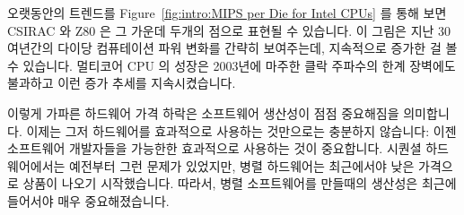 오랫동안의 트렌드를 Figure~\ref{fig:intro:MIPS per Die for Intel CPUs} 를 통해
보면 CSIRAC 와 Z80 은 그 가운데 두개의 점으로 표현될 수 있습니다.
이 그림은 지난 30여년간의 다이당 컴퓨테이션 파워 변화를 간략히 보여주는데,
지속적으로 증가한 걸 볼 수 있습니다.
멀티코어 CPU 의 성장은 2003년에 마주한 클락 주파수의 한계 장벽에도 불과하고
이런 증가 추세를 지속시켰습니다.


이렇게 가파른 하드웨어 가격 하락은 소프트웨어 생산성이 점점 중요해짐을 의미합니다.
이제는 그저 하드웨어를 효과적으로 사용하는 것만으로는 충분하지 않습니다:
이젠 소프트웨어 개발자들을 가능한한 효과적으로 사용하는 것이 중요합니다.
시퀀셜 하드웨어에서는 예전부터 그런 문제가 있었지만, 병렬 하드웨어는 최근에서야
낮은 가격으로 상품이 나오기 시작했습니다.
따라서, 병렬 소프트웨어를 만들때의 생산성은 최근에 들어서야 매우
중요해졌습니다.



